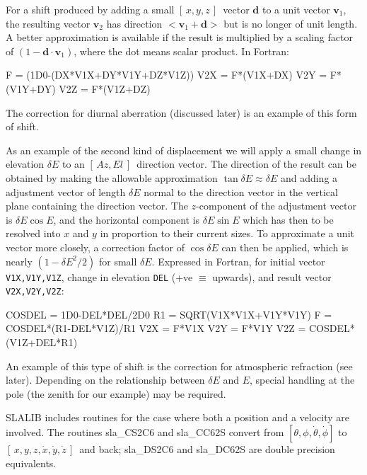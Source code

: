 \documentclass[11pt,twoside,nolof]{starlink}
\providecommand{\azel}      {$[\,Az,El~]$}
\providecommand{\xyz}       {$[\,x,y,z\,]$}
\providecommand{\xyzxyzd}   {$[\,x,y,z,\dot{x},\dot{y},\dot{z}\,]$}
\begin{document}
For a shift produced by adding a small \xyz\ vector $\textbf{d}$ to a
unit vector $\textbf{v}_1$, the resulting vector $\textbf{v}_2$ has direction
$<\textbf{v}_1+\textbf{d}>$ but is no longer of unit length.  A better approximation
is available if the result is multiplied by a scaling factor of
$(1-\textbf{d}\cdot\textbf{v}_1)$, where the dot
means scalar product.  In Fortran:
\goodbreak
\begin{terminalv}
            F = (1D0-(DX*V1X+DY*V1Y+DZ*V1Z))
            V2X = F*(V1X+DX)
            V2Y = F*(V1Y+DY)
            V2Z = F*(V1Z+DZ)
\end{terminalv}
\goodbreak
\noindent
The correction for diurnal aberration (discussed later) is
an example of this form of shift.

As an example of the second kind of displacement
we will apply a small change in elevation $\delta E$ to an
\azel\ direction vector.  The direction of the
result can be obtained by making the allowable approximation
${\tan \delta E\approx\delta E}$ and adding a adjustment
vector of length $\delta E$ normal
to the direction vector in the vertical plane containing the direction
vector.  The $z$-component of the adjustment vector is
$\delta E \cos E$,
and the horizontal component is
$\delta E \sin E$ which has then to be
resolved into $x$ and $y$ in proportion to their current sizes. To
approximate a unit vector more closely, a correction factor of
$\cos \delta E$ can then be applied, which is nearly
$(1-\delta E^2 /2)$ for
small $\delta E$.  Expressed in Fortran, for initial vector
\texttt{V1X,V1Y,V1Z}, change in elevation \texttt{DEL}
(+ve $\equiv$ upwards), and result
vector \texttt{V2X,V2Y,V2Z}:
\goodbreak
\begin{terminalv}
            COSDEL = 1D0-DEL*DEL/2D0
            R1 = SQRT(V1X*V1X+V1Y*V1Y)
            F = COSDEL*(R1-DEL*V1Z)/R1
            V2X = F*V1X
            V2Y = F*V1Y
            V2Z = COSDEL*(V1Z+DEL*R1)
\end{terminalv}
\goodbreak
An example of this type of shift is the correction for atmospheric
refraction (see later).
Depending on the relationship between $\delta E$ and $E$, special
handling at the pole (the zenith for our example) may be required.

SLALIB includes routines for the case where both a position
and a velocity are involved.  The routines
sla\_CS2C6
and
sla\_CC62S
convert from $[\theta,\phi,\dot{\theta},\dot{\phi}]$
to \xyzxyzd\ and back;
sla\_DS2C6
and
sla\_DC62S
are double precision equivalents.
\end{document}
